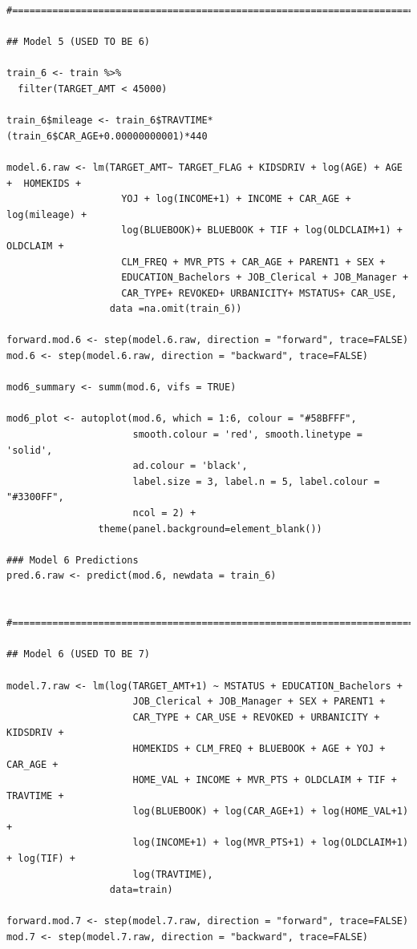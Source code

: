 \documentclass[]{article}
\begin{document}
\begin{verbatim}
#==============================================================================#

## Model 5 (USED TO BE 6)

train_6 <- train %>%
  filter(TARGET_AMT < 45000) 

train_6$mileage <- train_6$TRAVTIME*(train_6$CAR_AGE+0.00000000001)*440

model.6.raw <- lm(TARGET_AMT~ TARGET_FLAG + KIDSDRIV + log(AGE) + AGE +  HOMEKIDS +
                    YOJ + log(INCOME+1) + INCOME + CAR_AGE + log(mileage) + 
                    log(BLUEBOOK)+ BLUEBOOK + TIF + log(OLDCLAIM+1) + OLDCLAIM + 
                    CLM_FREQ + MVR_PTS + CAR_AGE + PARENT1 + SEX + 
                    EDUCATION_Bachelors + JOB_Clerical + JOB_Manager + 
                    CAR_TYPE+ REVOKED+ URBANICITY+ MSTATUS+ CAR_USE, 
                  data =na.omit(train_6))

forward.mod.6 <- step(model.6.raw, direction = "forward", trace=FALSE)
mod.6 <- step(model.6.raw, direction = "backward", trace=FALSE)

mod6_summary <- summ(mod.6, vifs = TRUE)

mod6_plot <- autoplot(mod.6, which = 1:6, colour = "#58BFFF",
                      smooth.colour = 'red', smooth.linetype = 'solid',
                      ad.colour = 'black',
                      label.size = 3, label.n = 5, label.colour = "#3300FF",
                      ncol = 2) +
                theme(panel.background=element_blank())

### Model 6 Predictions
pred.6.raw <- predict(mod.6, newdata = train_6)


#==============================================================================#

## Model 6 (USED TO BE 7)

model.7.raw <- lm(log(TARGET_AMT+1) ~ MSTATUS + EDUCATION_Bachelors + 
                      JOB_Clerical + JOB_Manager + SEX + PARENT1 +
                      CAR_TYPE + CAR_USE + REVOKED + URBANICITY + KIDSDRIV + 
                      HOMEKIDS + CLM_FREQ + BLUEBOOK + AGE + YOJ + CAR_AGE + 
                      HOME_VAL + INCOME + MVR_PTS + OLDCLAIM + TIF + TRAVTIME +
                      log(BLUEBOOK) + log(CAR_AGE+1) + log(HOME_VAL+1) + 
                      log(INCOME+1) + log(MVR_PTS+1) + log(OLDCLAIM+1) + log(TIF) + 
                      log(TRAVTIME), 
                  data=train)

forward.mod.7 <- step(model.7.raw, direction = "forward", trace=FALSE)
mod.7 <- step(model.7.raw, direction = "backward", trace=FALSE)


\end{verbatim}
\end{document}
